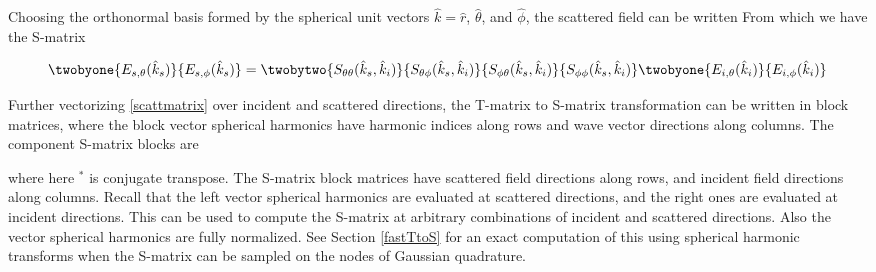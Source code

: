 
Choosing the orthonormal basis formed by the spherical unit vectors $\hat{k} = \hat{r}$, $\hat{\theta}$, and $\hat{\phi}$, the scattered field can be written 
From which we have the S-matrix 

\begin{equation}
\twobyone{E_{s,\theta}(\hat{k}_s)}{E_{s,\phi}(\hat{k}_s)} = 
\twobytwo
{S_{\theta\theta}(\hat{k}_s,\hat{k}_i) }
{S_{\theta\phi}(\hat{k}_s,\hat{k}_i) }
{S_{\phi\theta}(\hat{k}_s,\hat{k}_i) }
{S_{\phi\phi}(\hat{k}_s,\hat{k}_i) }   
\twobyone{E_{i,\theta}(\hat{k}_i)}{E_{i,\phi}(\hat{k}_i)} 
\end{equation}




Further vectorizing \eqref{scattmatrix} over incident and scattered directions, the T-matrix to S-matrix transformation can be written in block matrices, where the block vector spherical harmonics have harmonic indices along rows and wave vector directions along columns. The component S-matrix blocks are

\noindent where here $^*$ is conjugate transpose. The S-matrix block matrices have scattered field directions along rows, and incident field directions along columns. Recall that the left vector spherical harmonics are evaluated at scattered directions, and the right ones are evaluated at incident directions. This can be used to compute the S-matrix at arbitrary combinations of incident and scattered directions. Also the vector spherical harmonics are fully normalized.  See Section \ref{fastTtoS} for an exact computation of this using spherical harmonic transforms when the S-matrix can be sampled on the nodes of Gaussian quadrature. 

